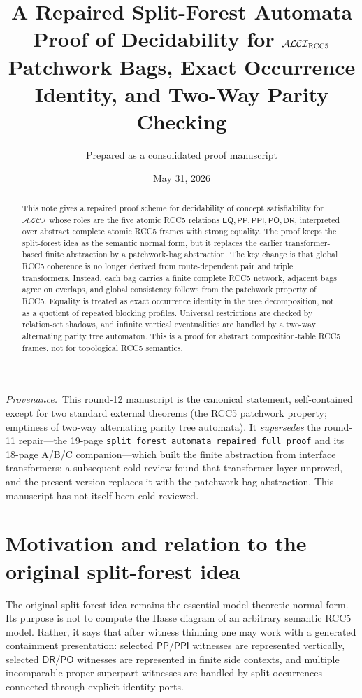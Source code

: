 \documentclass[11pt]{article}
\title{A Repaired Split-Forest Automata Proof of Decidability for $\mathcal{ALCI}_{\mathrm{RCC5}}$\\
\large Patchwork Bags, Exact Occurrence Identity, and Two-Way Parity Checking}
\author{Prepared as a consolidated proof manuscript}
\date{May 31, 2026}
\newcommand{\EQ}{\mathsf{EQ}}
\newcommand{\PP}{\mathsf{PP}}
\newcommand{\PPI}{\mathsf{PPI}}
\newcommand{\PO}{\mathsf{PO}}
\newcommand{\DR}{\mathsf{DR}}
\begin{document}
\maketitle

\begin{abstract}
This note gives a repaired proof scheme for decidability of concept satisfiability for
$\mathcal{ALCI}$ whose roles are the five atomic RCC5 relations
$\EQ,\PP,\PPI,\PO,\DR$, interpreted over abstract complete atomic RCC5 frames with
strong equality.  The proof keeps the split-forest idea as the semantic normal form, but
it replaces the earlier transformer-based finite abstraction by a patchwork-bag
abstraction.  The key change is that global RCC5 coherence is no longer derived from
route-dependent pair and triple transformers.  Instead, each bag carries a finite complete
RCC5 network, adjacent bags agree on overlaps, and global consistency follows from the
patchwork property of RCC5.  Equality is treated as exact occurrence identity in the tree
decomposition, not as a quotient of repeated blocking profiles.  Universal restrictions
are checked by relation-set shadows, and infinite vertical eventualities are handled by a
two-way alternating parity tree automaton.  This is a proof for abstract composition-table
RCC5 frames, not for topological RCC5 semantics.
\end{abstract}

\medskip
\noindent\emph{Provenance.}\ This round-12 manuscript is the canonical statement,
self-contained except for two standard external theorems (the RCC5 patchwork property;
emptiness of two-way alternating parity tree automata).  It \emph{supersedes} the round-11
repair---the 19-page \texttt{split\_forest\_automata\_repaired\_full\_proof} and its
18-page A/B/C companion---which built the finite abstraction from interface transformers;
a subsequent cold review found that transformer layer unproved, and the present version
replaces it with the patchwork-bag abstraction.  This manuscript has not itself been
cold-reviewed.

\tableofcontents

\section{Motivation and relation to the original split-forest idea}

The original split-forest idea remains the essential model-theoretic normal form.  Its
purpose is not to compute the Hasse diagram of an arbitrary semantic RCC5 model.  Rather,
it says that after witness thinning one may work with a generated containment
presentation: selected $\PP/\PPI$ witnesses are represented vertically, selected
$\DR/\PO$ witnesses are represented in finite side contexts, and multiple incomparable
proper-superpart witnesses are handled by split occurrences connected through explicit
identity ports.
\end{document}
